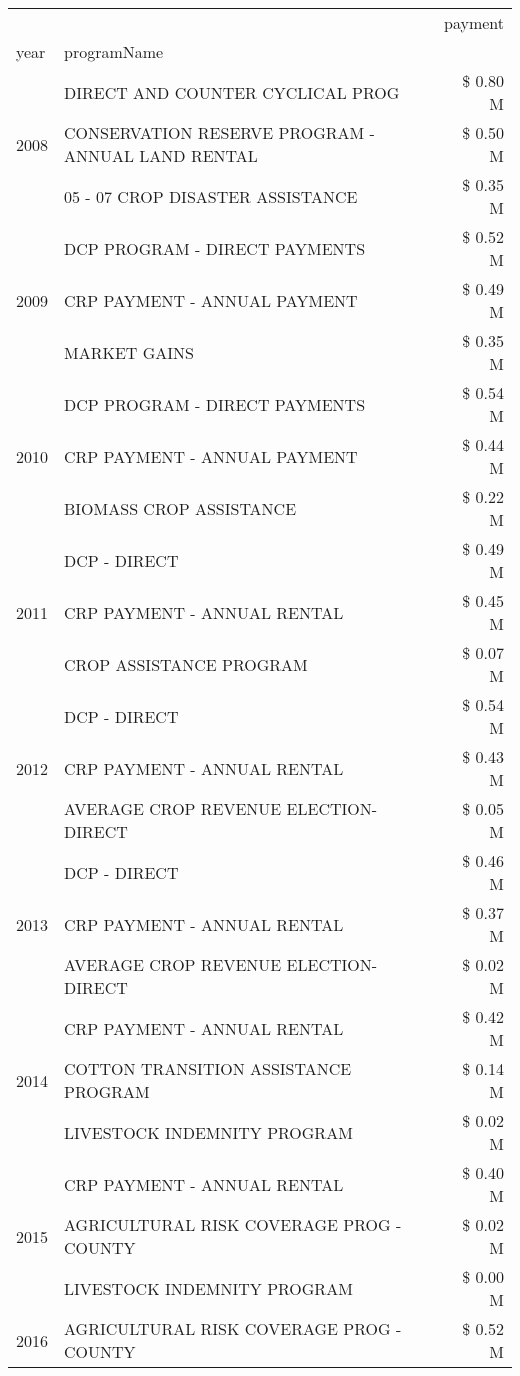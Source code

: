 \begin{tabular}{llr}
\toprule
 &  & payment \\
year & programName &  \\
\midrule
\multirow[t]{3}{*}{2008} & DIRECT AND COUNTER CYCLICAL PROG & \$ 0.80 M \\
 & CONSERVATION RESERVE PROGRAM - ANNUAL LAND RENTAL & \$ 0.50 M \\
 & 05 - 07 CROP DISASTER ASSISTANCE & \$ 0.35 M \\
\cline{1-3}
\multirow[t]{3}{*}{2009} & DCP PROGRAM - DIRECT PAYMENTS & \$ 0.52 M \\
 & CRP PAYMENT - ANNUAL PAYMENT & \$ 0.49 M \\
 & MARKET GAINS & \$ 0.35 M \\
\cline{1-3}
\multirow[t]{3}{*}{2010} & DCP PROGRAM - DIRECT PAYMENTS & \$ 0.54 M \\
 & CRP PAYMENT - ANNUAL PAYMENT & \$ 0.44 M \\
 & BIOMASS CROP ASSISTANCE & \$ 0.22 M \\
\cline{1-3}
\multirow[t]{3}{*}{2011} & DCP - DIRECT & \$ 0.49 M \\
 & CRP PAYMENT - ANNUAL RENTAL & \$ 0.45 M \\
 & CROP ASSISTANCE PROGRAM & \$ 0.07 M \\
\cline{1-3}
\multirow[t]{3}{*}{2012} & DCP - DIRECT & \$ 0.54 M \\
 & CRP PAYMENT - ANNUAL RENTAL & \$ 0.43 M \\
 & AVERAGE CROP REVENUE ELECTION-DIRECT & \$ 0.05 M \\
\cline{1-3}
\multirow[t]{3}{*}{2013} & DCP - DIRECT & \$ 0.46 M \\
 & CRP PAYMENT - ANNUAL RENTAL & \$ 0.37 M \\
 & AVERAGE CROP REVENUE ELECTION-DIRECT & \$ 0.02 M \\
\cline{1-3}
\multirow[t]{3}{*}{2014} & CRP PAYMENT - ANNUAL RENTAL & \$ 0.42 M \\
 & COTTON TRANSITION ASSISTANCE PROGRAM & \$ 0.14 M \\
 & LIVESTOCK INDEMNITY PROGRAM & \$ 0.02 M \\
\cline{1-3}
\multirow[t]{3}{*}{2015} & CRP PAYMENT - ANNUAL RENTAL & \$ 0.40 M \\
 & AGRICULTURAL RISK COVERAGE PROG - COUNTY & \$ 0.02 M \\
 & LIVESTOCK INDEMNITY PROGRAM & \$ 0.00 M \\
\cline{1-3}
\multirow[t]{3}{*}{2016} & AGRICULTURAL RISK COVERAGE PROG - COUNTY & \$ 0.52 M \\

\end{tabular}
